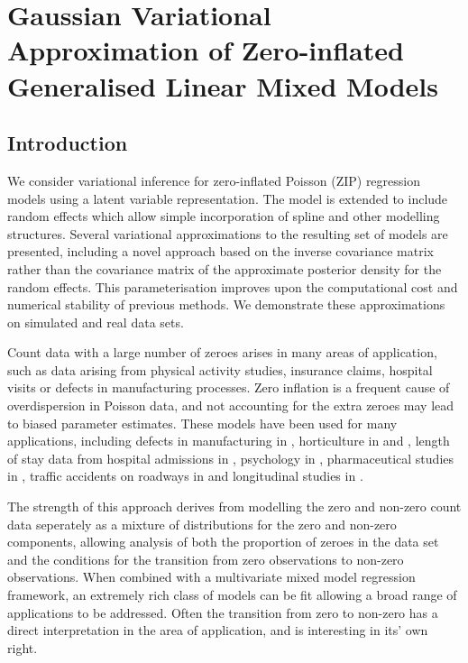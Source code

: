 \chapter{Gaussian Variational Approximation of Zero-inflated Generalised
         Linear Mixed Models}


\section{Introduction}
\label{sec:introduction}
We consider variational inference for zero-inflated Poisson (ZIP)
regression models using a latent variable representation. The model is
extended to include random effects which allow simple incorporation of
spline and other modelling structures. Several variational approximations
to the resulting set of models are presented, including a novel approach
based on the inverse covariance matrix rather than the covariance matrix of
the approximate posterior density for the random effects. This
parameterisation improves upon the computational cost and numerical
stability of previous methods. We demonstrate these approximations on
simulated and real data sets.

Count data with a large number of zeroes arises in many areas of application,
such as data arising from physical activity studies, insurance claims, hospital
visits or defects in manufacturing processes. Zero inflation is a frequent
cause of overdispersion in Poisson data, and not accounting for the extra
zeroes may lead to biased parameter estimates. These models have been used for
many applications, including defects in manufacturing in \cite{lambert1992},
horticulture in \cite{BIOM:BIOM1030} and \cite{BIOM:BIOM1030}, length of stay
data from hospital admissions in \cite{BIMJ:BIMJ200390024}, psychology in
\cite{JOFP:rethink}, pharmaceutical studies in \cite{Min01042005}, traffic
accidents on roadways in \cite{Shankar1997829} and longitudinal studies in
\cite{LeeWangScottYauMcLachlan2006}.

The strength of this approach derives from modelling the zero and non-zero
count data seperately as a mixture of distributions for the zero and non-zero
components, allowing analysis of both the proportion of zeroes in the data set
and the conditions for the transition from zero observations to non-zero
observations. When combined with a multivariate mixed model regression
framework, an extremely rich class of models can be fit allowing a broad range
of applications to be addressed. Often the transition from zero to non-zero has
a direct interpretation in the area of application, and is interesting in its'
own right.

